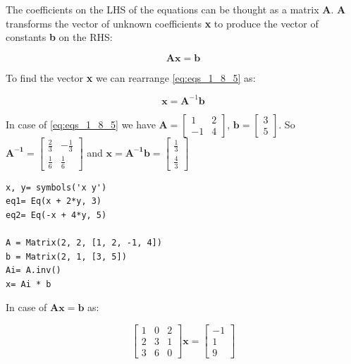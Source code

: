 The coefficients on the LHS of the equations can be thought as a matrix
\textbf{A}. \textbf{A} transforms the vector of unknown coefficients \textbf{x}
to produce the vector of constants \textbf{b} on the RHS:

\begin{equation}\label{eq:1_8_5}
\mathbf{A}\mathbf{x} = \mathbf{b}
\end{equation}

To find the vector \textbf{x} we can rearrange \ref{eq:eqs_1_8_5} as:

\begin{equation}
\mathbf{x} = \mathbf{A}^{-1}\mathbf{b}
\end{equation}

In case of \ref{eq:eqs_1_8_5} we have $\mathbf{A} = \left[\begin{matrix}1 & 2\\-1 & 4\end{matrix}\right]$,
$\mathbf{b} = \left[\begin{matrix}3\\5\end{matrix}\right]$. So
$\mathbf{A^{-1}} = \left[\begin{matrix}\frac{2}{3} & - \frac{1}{3}\\\frac{1}{6} & \frac{1}{6}\end{matrix}\right]$
and $\mathbf{x} = \mathbf{A^{-1}b} = \left[\begin{matrix}\frac{1}{3}\\\frac{4}{3}\end{matrix}\right]$

\begin{verbatim}
x, y= symbols('x y')
eq1= Eq(x + 2*y, 3)
eq2= Eq(-x + 4*y, 5)

A = Matrix(2, 2, [1, 2, -1, 4])
b = Matrix(2, 1, [3, 5])
Ai= A.inv()
x= Ai * b
\end{verbatim}

In case of $\mathbf{Ax = b}$ as:

\begin{equation}\label{eq:}
\left[\begin{matrix}1 & 0 & 2\\2 & 3 & 1\\3 & 6 & 0\end{matrix}\right]
\mathbf{x} = 
\left[\begin{matrix}-1\\1\\9\end{matrix}\right]
\end{equation}

